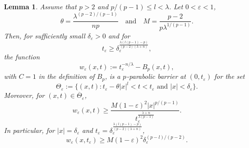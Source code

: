 \documentclass[10pt,a4paper]{amsart}
\newtheorem{lem}{Lemma}
\newcommand{\de}{\delta}
\newcommand{\eps}{\varepsilon}
\newcommand{\la}{\lambda}
\newcommand{\p}{{$p\mspace{1mu}$}}
\begin{document}
\begin{lem} \label{lem-Bar-w}
Assume that $p>2$ and $p/(p-1)\le l <\la$.
Let $0<\eps<1$, 
\begin{equation}      \label{eq-theta-M}
 \theta  
 =\frac{\la^{(p-2)/(p-1)}}{np}
 \quad \text{and} \quad
   M = \frac{p-2}{p \la^{1/(p-1)}}.
\end{equation}
Then, for sufficiently small $\de_\eps>0$ and for 
\begin{equation}  \label{eq-t_eps}
t_\eps \ge \de_\eps^{\frac{\la (l(p-1)-p)}{(p-2)(\la+n)}},
\end{equation}
the function
\[
w_\eps(x,t):= t_\eps^{-n/\la} - B_p(x,t),
\]
with $C=1$ in the definition of $B_p$,
is  a \p-parabolic barrier at $(0,t_\eps)$ for the set
\[
\Theta_\eps:=\{(x,t): 
t_\eps-\theta |x|^l< t < t_\eps
\text{ and }  |x| <  \de_\eps\}.  
\]
Moreover, for $(x,t)\in \overline{\Theta}_\eps$,
\begin{equation}   \label{eq-weps-new}
w_{\eps}(x,t) \ge \frac{M(1-\eps)^2 |x|^{p/(p-1)}}{ t_\eps^{\frac{\la+n}{\la(p-1)}} }.
\end{equation}
In particular, for $|x|=\de_\eps$ and 
$t_\eps= \de_\eps^{\frac{\la (l(p-1)-p)}{(p-2)(\la+n)}}$,
\begin{equation}   \label{eq-est-weps-at-de-eps-teps}
w_{\eps}(x,t_\eps) \ge M(1-\eps)^2 \de_\eps^{(p-l)/(p-2)}.
\end{equation}
\end{lem}
\end{document}
